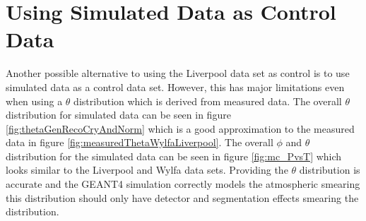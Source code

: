 \clearpage
\section{Using Simulated Data as Control Data}\label{sec:usingSimulatedDataAsControlData}
Another possible alternative to using the Liverpool data set as control is to use simulated data as a control data set. However, this has major limitations even when using a $\theta$ distribution which is derived from measured data. The overall $\theta$ distribution for simulated data can be seen in figure \ref{fig:thetaGenRecoCryAndNorm} which is a good approximation to the measured data in figure \ref{fig:measuredThetaWylfaLiverpool}. The overall $\phi$ and $\theta$ distribution for the simulated data can be seen in figure \ref{fig:mc_PvsT} which looks similar to the Liverpool and Wylfa data sets. Providing the $\theta$ distribution is accurate and the GEANT4 simulation correctly models the atmospheric smearing this distribution should only have detector and segmentation effects smearing the distribution. 


